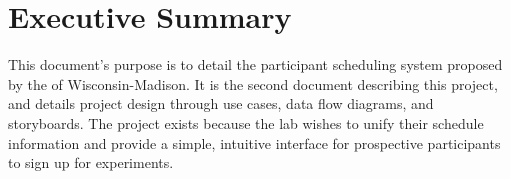 \newcommand{\puttitle}{Milestone 2}


\section{Executive Summary}
This document's purpose is to detail the participant scheduling system proposed by the  of Wisconsin-Madison. It is the second document describing this project, and details project design through use cases, data flow diagrams, and storyboards.  The project exists because the lab wishes to unify their schedule information and provide a simple, intuitive interface for prospective participants to sign up for experiments.











